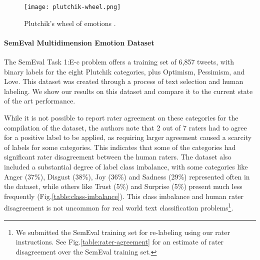 \documentclass[letterpaper]{article} \usepackage{aaai19}  \usepackage{times}  \usepackage{helvet}  \usepackage{courier}  \usepackage{url}  \usepackage{graphicx}  \usepackage{booktabs}
\begin{document}
\begin{figure}[t!] 
  \begin{center}
    \texttt{[image: plutchik-wheel.png]}
    \caption{Plutchik's wheel of emotions \protect\cite{Plutchik1979}.}
    \label{fig:Plutchik_wheel}
  \end{center}
\end{figure}


\paragraph{SemEval Multidimension Emotion Dataset}

The SemEval Task 1:E-c problem \protect\cite{SemEval2018Task1} offers a training set of 6,857 tweets, with binary labels for the eight Plutchik categories, plus Optimism, Pessimism, and Love. This dataset was created through a process of text selection and human labeling. We show our results on this dataset and compare it to the current state of the art performance.


While it is not possible to report rater agreement on these categories for the compilation of the dataset, the authors note that 2 out of 7 raters had to agree for a positive label to be applied, as requiring larger agreement caused a scarcity of labels for some categories. This indicates that some of the categories had significant rater disagreement between the human raters. The dataset also included a substantial degree of label class imbalance, with some categories like Anger (37\%), Disgust (38\%), Joy (36\%) and Sadness (29\%) represented often in the dataset, while others like Trust (5\%) and Surprise (5\%) present much less frequently (Fig.\ref{table:class-imbalance}). This class imbalance and human rater disagreement is not uncommon for real world text classification problems\footnote{We submitted the SemEval training set for re-labeling using our rater instructions. See Fig.\ref{table:rater-agreement} for an estimate of rater disagreement over the SemEval training set.}. 


\begin{table*}[!t]
\centering
\caption{Label class balance (as percent) for SemEval and company tweet datasets.}
\label{table:class-imbalance}
\end{table*}
\end{document}
